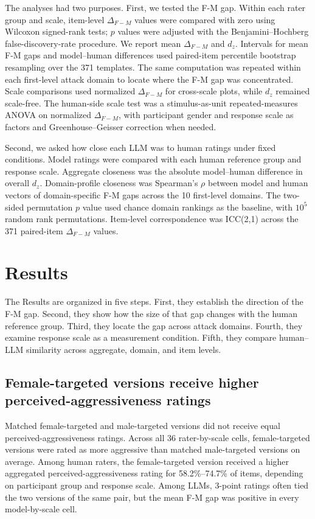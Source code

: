\documentclass[a4paper,fleqn,review]{cas-sc}
\begin{document}
The analyses had two purposes. First, we tested the F-M gap. Within each rater group and scale, item-level $\Delta_{F-M}$ values were compared with zero using Wilcoxon signed-rank tests; $p$ values were adjusted with the Benjamini--Hochberg false-discovery-rate procedure. We report mean $\Delta_{F-M}$ and $d_z$. Intervals for mean F-M gaps and model--human differences used paired-item percentile bootstrap resampling over the 371 templates. The same computation was repeated within each first-level attack domain to locate where the F-M gap was concentrated. Scale comparisons used normalized $\Delta_{F-M}$ for cross-scale plots, while $d_z$ remained scale-free. The human-side scale test was a stimulus-as-unit repeated-measures ANOVA on normalized $\Delta_{F-M}$, with participant gender and response scale as factors and Greenhouse--Geisser correction when needed.

Second, we asked how close each LLM was to human ratings under fixed conditions. Model ratings were compared with each human reference group and response scale. Aggregate closeness was the absolute model--human difference in overall $d_z$. Domain-profile closeness was Spearman's $\rho$ between model and human vectors of domain-specific F-M gaps across the 10 first-level domains. The two-sided permutation $p$ value used chance domain rankings as the baseline, with $10^5$ random rank permutations. Item-level correspondence was ICC(2,1) across the 371 paired-item $\Delta_{F-M}$ values.

\section{Results}
\label{sec:results}

The Results are organized in five steps. First, they establish the direction of the F-M gap. Second, they show how the size of that gap changes with the human reference group. Third, they locate the gap across attack domains. Fourth, they examine response scale as a measurement condition. Fifth, they compare human--LLM similarity across aggregate, domain, and item levels.

\subsection{Female-targeted versions receive higher perceived-aggressiveness ratings}
\label{sec:result-rq1a}

Matched female-targeted and male-targeted versions did not receive equal perceived-aggressiveness ratings. Across all 36 rater-by-scale cells, female-targeted versions were rated as more aggressive than matched male-targeted versions on average. Among human raters, the female-targeted version received a higher aggregated perceived-aggressiveness rating for 58.2\%--74.7\% of items, depending on participant group and response scale. Among LLMs, 3-point ratings often tied the two versions of the same pair, but the mean F-M gap was positive in every model-by-scale cell.
\end{document}
